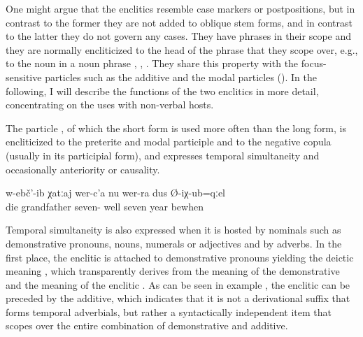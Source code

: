 One might argue that the enclitics resemble case markers or postpositions, but in contrast to the former they are not added to oblique stem forms, and in contrast to the latter they do not govern any cases. They have phrases in their scope and they are normally encliticized to the head of the phrase that they scope over, e.g., to the noun in a noun phrase , , . They share this property with the focus-sensitive particles such as the additive and the modal particles (). In the following, I will describe the functions of the two enclitics in more detail, concentrating on the uses with non-verbal hosts.

The particle , of which the short form is used more often than the long form, is encliticized to the preterite and modal participle and to the negative copula (usually in its participial form), and expresses temporal simultaneity  and occasionally anteriority or causality. 

\begin{exe}
	\ex	\label{ex:‎Grandfather died when he was 77 years old}
	\gll	w-ebč'-ib	χatːaj	wer-c'a	nu	wer-ra	dus	Ø-iχ-ub=qːel\\
		die	grandfather	seven-	well seven	year	bewhen\\
	\glt	{}
\end{exe}

Temporal simultaneity is also expressed when it is hosted by nominals such as demonstrative pronouns, nouns, numerals or adjectives and by adverbs. In the first place, the enclitic is attached to demonstrative pronouns yielding the deictic meaning , which transparently derives from the meaning of the demonstrative and the meaning of the enclitic . As can be seen in example , the enclitic can be preceded by the additive, which indicates that it is not a derivational suffix that forms temporal adverbials, but rather a syntactically independent item that scopes over the entire combination of demonstrative and additive. 

